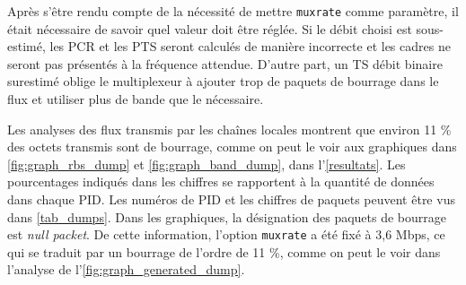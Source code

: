 \documentclass[12pt,a4paper]{article}
\begin{document}
Après s'être rendu compte de la nécessité de mettre \texttt{muxrate} comme paramètre, il était nécessaire de savoir quel valeur doit être réglée. Si le débit choisi est sous-estimé, les PCR et les PTS seront calculés de manière incorrecte et les cadres ne seront pas présentés à la fréquence attendue. D'autre part, un TS débit binaire surestimé oblige le multiplexeur à ajouter trop de paquets de bourrage dans le flux et utiliser plus de bande que le nécessaire.


Les analyses des flux transmis par les chaînes locales montrent que environ 11 \% des octets transmis sont de bourrage, comme on peut le voir aux graphiques dans \autoref{fig:graph_rbs_dump} et \autoref{fig:graph_band_dump}, dans l'\autoref{resultats}. Les pourcentages indiqués dans les chiffres se rapportent à la quantité de données dans chaque PID. Les numéros de PID et les chiffres de paquets peuvent être vus dans \autoref{tab_dumps}. Dans les graphiques, la désignation des paquets de bourrage est \textit{null packet}. De cette information, l'option \texttt{muxrate} a été fixé à 3,6 Mbps, ce qui se traduit par un bourrage de l'ordre de 11 \%, comme on peut le voir dans l'analyse de l'\autoref{fig:graph_generated_dump}.

\end{document}
